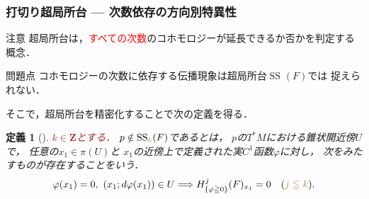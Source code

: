 \documentclass[dvipdfmx,10pt,aspectratio=169,leqno]{beamer}%
\newcommand{\zz}{\mathbf{Z}}
\numberwithin{equation}{subsection}
\newcommand{\muS}[1][]{\mathop{\mathrm{SS}}\nolimits_{#1}}
\newcommand{\cotb}[1][]{T^{\ast}{#1}}
\theoremstyle{mystyle}
\newtheorem{DFN}[AXM]{定義}
\begin{document}
\begin{frame}\frametitle{打切り超局所台 --- 次数依存の方向別特異性}
    \begin{alertblock}{注意}
        超局所台は，\textcolor{red}{すべての次数}のコホモロジーが延長できるか否かを判定する概念．
    \end{alertblock}\pause
    \begin{alertblock}{問題点}
      コホモロジーの次数に依存する伝播現象は超局所台\(\muS[](F)\)では
      捉えられない．
    \end{alertblock}
    
    そこで，超局所台を精密化することで次の定義を得る．\pause
    \begin{DFN}[{\cite[Definition 3.4]{KFS03a}}]
        \textcolor{brown}{\(k\in\zz\)とする．}
        \(p\notin \muS[\textcolor{brown}{k}](F)\)であるとは，
        \(p\)の\(\cotb[M]\)における錐状開近傍\(U\)で，
        任意の\(x_1\in \pi(U)\)と
        \(x_1\)の近傍上で定義された実\(C^{1}\)函数\(\varphi\)に対し，
        次をみたすものが存在することをいう．
        \[
            \varphi(x_1)=0,\ (x_1;d\varphi(x_1))\in U
            \Longrightarrow
            H^{j}_{\{\varphi\geqq0\}}(F)_{x_1}=0
            \quad
            (\textcolor{brown}{j\leqq k}).
        \]
    \end{DFN}
\end{frame}
\end{document}
